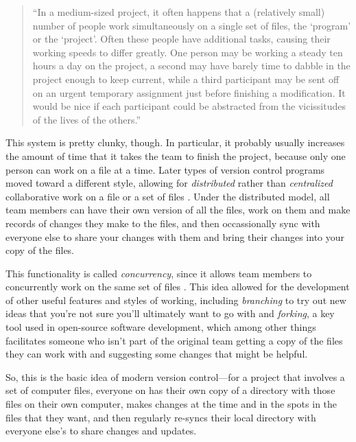 \documentclass[]{tufte-book}
\begin{document}
\begin{quote}
``In a medium-sized project, it often happens that a (relatively small) number
of people work simultaneously on a single set of files, the `program' or the
`project'. Often these people have additional tasks, causing their working
speeds to differ greatly. One person may be working a steady ten hours a day on
the project, a second may have barely time to dabble in the project enough to
keep current, while a third participant may be sent off on an urgent temporary
assignment just before finishing a modification. It would be nice if each
participant could be abstracted from the vicissitudes of the lives of the
others.'' \citep{grune1986concurrent}
\end{quote}

This system is pretty clunky, though. In particular, it probably usually
increases the amount of time that it takes the team to finish the project,
because only one person can work on a file at a time. Later types of version
control programs moved toward a different style, allowing for \emph{distributed}
rather than \emph{centralized} collaborative work on a file or a set of files
\citep{raymondunderstanding, irving2011astonishments}. Under the distributed model,
all team members can have their own version of all the files, work on them and
make records of changes they make to the files, and then occassionally sync with
everyone else to share your changes with them and bring their changes into your
copy of the files.

This functionality is called \emph{concurrency}, since it allows team members to
concurrently work on the same set of files \citep{raymondunderstanding}. This idea
allowed for the development of other useful features and styles of working,
including \emph{branching} to try out new ideas that you're not sure you'll
ultimately want to go with and \emph{forking}, a key tool used in open-source
software development, which among other things facilitates someone who isn't
part of the original team getting a copy of the files they can work with and
suggesting some changes that might be helpful.

So, this is the basic idea of modern version control---for a project that involves a set
of computer files, everyone on has their own copy of a directory with those files
on their own computer, makes changes at the time and in the spots in the files that
they want, and then regularly re-syncs their local directory with everyone else's
to share changes and updates.
\end{document}
